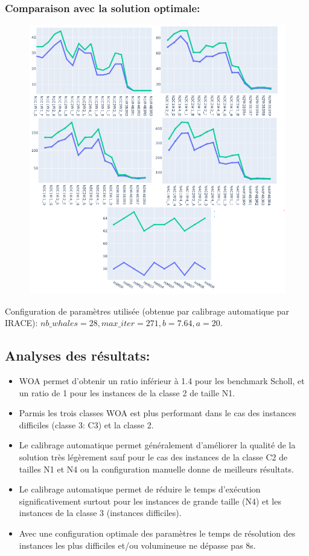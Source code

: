 \documentclass[12pt]{article}
\begin{document}
\subsubsection{Comparaison avec la solution optimale: }
\begin{figure}[!hbt]
    \includegraphics[width=\linewidth, scale=1.3]{../figures/WOA/woa_opt.png}
\end{figure}
Configuration de paramètres utilisée (obtenue par calibrage automatique par IRACE): \(nb\_whales=28, max\_iter=271,  b=7.64, a=20\).

\subsection{Analyses des résultats: }
\begin{itemize}
    \item WOA permet d'obtenir un ratio inférieur à 1.4 pour les benchmark Scholl, et un ratio de 1 pour les instances de la classe 2 de taille N1.
    \item Parmis les trois classes WOA est plus performant dans le cas des instances difficiles (classe 3: C3) et la classe 2.
    \item Le calibrage automatique permet généralement d’améliorer la qualité de la solution très légèrement sauf pour le cas des instances de la classe C2 de tailles N1 et N4 ou la configuration manuelle donne de meilleurs résultats.
    \item Le calibrage automatique permet de réduire le temps d’exécution significativement surtout pour les instances de grande taille (N4) et les instances de la classe 3 (instances difficiles).
    \item Avec une configuration optimale des paramètres le temps de résolution des instances les plus difficiles et/ou volumineuse ne dépasse pas 8s.
\end{itemize}
\end{document}
